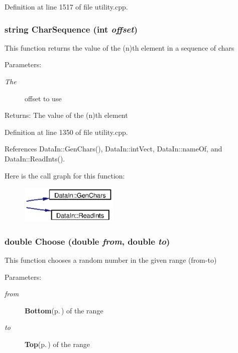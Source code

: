 Definition at line 1517 of file utility.cpp.
\subsubsection{\setlength{\rightskip}{0pt plus 5cm}string Char\-Sequence (int {\em offset})}\label{utility_8cpp_a20}


This function returns the value of the (n)th element in a sequence of chars \begin{Desc}
\item[Parameters:]
\begin{description}
\item[{\em The}]offset to use \end{description}
\end{Desc}
\begin{Desc}
\item[Returns:]The value of the (n)th element \end{Desc}


Definition at line 1350 of file utility.cpp.

References Data\-In::Gen\-Chars(), Data\-In::int\-Vect, Data\-In::name\-Of, and Data\-In::Read\-Ints().

Here is the call graph for this function:\begin{figure}[H]
\begin{center}
\leavevmode
\includegraphics[width=132pt]{utility_8cpp_a20_cgraph}
\end{center}
\end{figure}
\subsubsection{\setlength{\rightskip}{0pt plus 5cm}double Choose (double {\em from}, double {\em to})}\label{utility_8cpp_a6}


This function chooses a random number in the given range (from-to) \begin{Desc}
\item[Parameters:]
\begin{description}
\item[{\em from}]{\bf Bottom}{\rm (p.\,\pageref{classBottom})} of the range \item[{\em to}]{\bf Top}{\rm (p.\,\pageref{classTop})} of the range \end{description}
\end{Desc}


